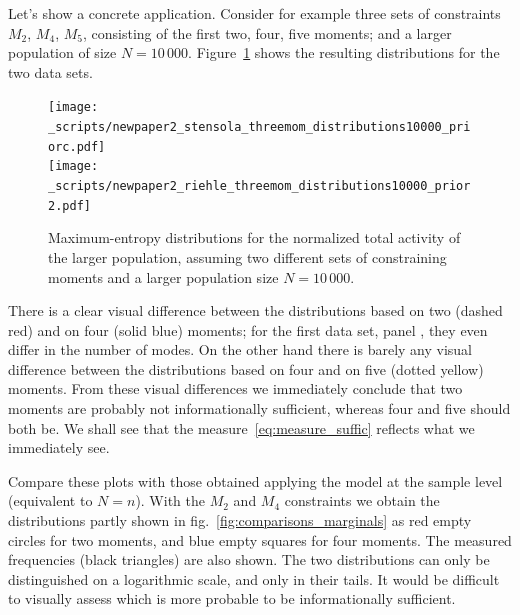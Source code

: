 \documentclass[\ifafour a4paper,12pt,\else a5paper,10pt,\fi%
onecolumn,oneside,article,%
british%
]{memoir}
\theoremstyle{remark}
\theoremstyle{innote}
\renewcommand*{\|}{\nonscript\,\vert\nonscript\;\mathopen{}}
\newcommand*{\fig}{fig.}%
\begin{document}
Let's show a concrete application. Consider for example three sets of
constraints $M_{2}$, $M_{4}$, $M_{5}$, consisting of the first two, four,
five moments; and a larger population of size $N=10\,000$.
Figure~\ref{fig:plots_2_4mom} shows the resulting distributions for the two
data sets.
\begin{figure}[!p]
\centering
\subcaption[]{\label{fig:plots_2_4mom_a}}%
\texttt{[image: \_scripts/newpaper2\_stensola\_threemom\_distributions10000\_priorc.pdf]}%
\\[2em]%
\subcaption[]{\label{fig:plots_2_4mom_b}}%
\texttt{[image: \_scripts/newpaper2\_riehle\_threemom\_distributions10000\_prior2.pdf]}%
\\[2em]%
\caption{Maximum-entropy distributions for the normalized total activity of
  the larger population, assuming two different sets of constraining moments
  and a larger population size $N=10\,000$.}
\label{fig:plots_2_4mom}
\end{figure}
There is a clear visual difference between the distributions based on two
(\textcolor{myred}{dashed red}) and on four (\textcolor{myblue}{solid
  blue}) moments; for the first data set, panel
, they even differ in the number of
modes. On the other hand there is barely any visual difference between the
distributions based on four and on five (\textcolor{myyellow}{dotted
  yellow}) moments. From these visual differences we immediately conclude
that two moments are probably not informationally sufficient, whereas four
and five should both be. We shall see that the
measure~\eqref{eq:measure_suffic} reflects what we immediately see.

Compare these plots with those obtained applying the model at the sample
level (equivalent to $N=n$). With the $M_{2}$ and $M_{4}$ constraints we
obtain the distributions partly shown in
\fig~\ref{fig:comparisons_marginals} as \textcolor{myred}{red empty
  circles} for two moments, and \textcolor{myblue}{blue empty squares} for
four moments. The measured frequencies (black triangles) are also shown.
The two distributions can only be distinguished on a logarithmic scale, and
only in their tails. It would be difficult to visually assess which is more
probable to be informationally sufficient.

\medskip
\end{document}

